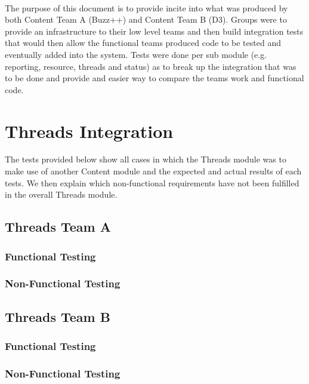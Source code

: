 \documentclass[12pt, oneside]{article}
\begin{document}
	\paragraph{}
	The purpose of this document is to provide incite into what was produced by both Content  Team A (Buzz++) and Content Team B (D3). Groups were to provide an infrastructure to their low level teams and then build integration tests that would then allow the functional teams produced code to be tested and eventually added into the system. Tests were done per sub module (e.g. reporting, resource, threads and status) as to break up the integration that was to be done and provide and easier way to compare the teams work and functional code.
	
\section{Threads Integration}
The tests provided below show all cases in which the Threads module was to make use of another Content module and the expected and actual results of each tests. We then explain which non-functional requirements have not been fulfilled in the overall Threads module.
	\subsection{Threads Team A}	
		\subsubsection{Functional Testing}
			
		\subsubsection{Non-Functional Testing }
			
	
	\subsection{Threads Team B}	
		\subsubsection{Functional Testing}
			
		\subsubsection{Non-Functional Testing }
			
	
\end{document}

